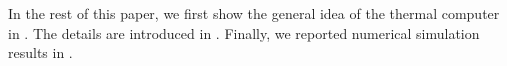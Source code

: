 \documentclass[twocolumn,superscriptaddress,english,showpacs,longbibliography]{revtex4-2}
\begin{document}
In the rest of this paper, we first show the general idea of the thermal computer in .
The details are introduced in .
Finally, we reported numerical simulation results in .




\end{document}
